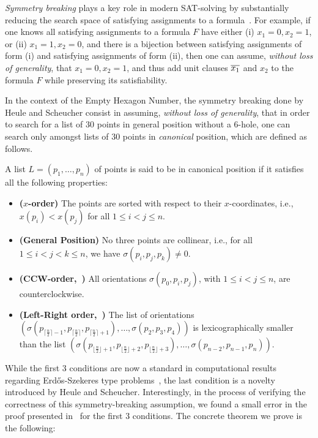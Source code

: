 \emph{Symmetry breaking} plays a key role in modern SAT-solving by substantially reducing the search space of satisfying assignments to a formula~\cite{biereHandbookSatisfiabilityVolume2009}. For example, if one knows all satisfying assignments to a formula $F$ have either (i) $x_1 = 0, x_2 = 1$, or  (ii) $x_1 = 1, x_2 = 0$, and there is a bijection between satisfying assignments of form (i) and satisfying assignments of form (ii), then one can assume, \emph{without loss of generality}, that $x_1 = 0, x_2 = 1$, and thus add unit clauses $\overline{x_1}$ and $x_2$ to the formula $F$ while preserving its satisfiability. 

In the context of the Empty Hexagon Number, the symmetry breaking done by Heule and Scheucher consist in assuming, \emph{without loss of generality}, that in order to search for a list of $30$ points in general position without a $6$-hole, one can search only amongst lists of $30$ points in \emph{canonical} position, which are defined as follows.   
\begin{definition}
A list $L = (p_1,\ldots, p_{n})$ of points is said to be in canonical position if it satisfies all the following properties:
\begin{itemize}
    \item \textbf{($x$-order)} The points are sorted with respect to their $x$-coordinates, i.e., $x(p_i) < x(p_j)$ for all $1 \leq i < j \leq n$.
    \item \textbf{(General Position)} No three points are collinear, i.e., for all $1 \leq i < j < k \leq n$, we have $\sigma(p_i, p_j, p_k) \neq 0$. 
    \item \textbf{(CCW-order,~)} All orientations $\sigma(p_0, p_i, p_j)$, with $1 \leq i < j \leq n$, are counterclockwise.
    \item \textbf{(Left-Right order,~)} The list of orientations $\left(\sigma\left(p_{\lceil \frac{n}{2} \rceil -1}, p_{\lceil \frac{n}{2} \rceil},p_{\lceil \frac{n}{2} \rceil+1}\right), \ldots, \sigma\left(p_2, p_3, p_4\right) \right)$ is lexicographically smaller than the list $\left(\sigma\left(p_{\lfloor \frac{n}{2} \rfloor  + 1}, p_{\lfloor \frac{n}{2} \rfloor+2},p_{\lfloor \frac{n}{2} \rfloor+3}\right), \ldots, \sigma\left(p_{n-2}, p_{n-1}, p_{n}\right) \right)$.
\end{itemize}
\end{definition}
    While the first 3 conditions are now a standard in computational results regarding Erd\H{o}s-Szekeres type problems~\cite{scheucherTwoDisjoint5holes2020}, the last condition is a novelty introduced by Heule and Scheucher.
    Interestingly, in the process of verifying the correctness of this symmetry-breaking assumption, we found a small error in the proof presented in~\cite{scheucherTwoDisjoint5holes2020} for the first $3$ conditions. 
The concrete theorem we prove is the following:

